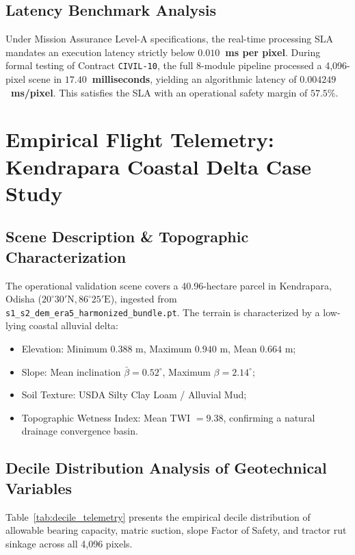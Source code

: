 \documentclass[11pt,a4paper]{article}
\theoremstyle{definition}
\theoremstyle{remark}
\begin{document}
\subsection{Latency Benchmark Analysis}
Under Mission Assurance Level-A specifications, the real-time processing SLA mandates an execution latency strictly below \textbf{$0.010$~ms per pixel}. During formal testing of Contract \texttt{CIVIL-10}, the full 8-module pipeline processed a 4,096-pixel scene in \textbf{$17.40$~milliseconds}, yielding an algorithmic latency of \textbf{$0.004249$~ms/pixel}. This satisfies the SLA with an operational safety margin of \textbf{$57.5\%$}.


\section{Empirical Flight Telemetry: Kendrapara Coastal Delta Case Study}

\subsection{Scene Description & Topographic Characterization}
The operational validation scene covers a 40.96-hectare parcel in Kendrapara, Odisha ($20^\circ 30' \text{N}, 86^\circ 25' \text{E}$), ingested from \texttt{s1\_s2\_dem\_era5\_harmonized\_bundle.pt}. The terrain is characterized by a low-lying coastal alluvial delta:
\begin{itemize}
    \item Elevation: Minimum $0.388\text{ m}$, Maximum $0.940\text{ m}$, Mean $0.664\text{ m}$;
    \item Slope: Mean inclination $\bar{\beta} = 0.52^\circ$, Maximum $\beta = 2.14^\circ$;
    \item Soil Texture: USDA Silty Clay Loam / Alluvial Mud;
    \item Topographic Wetness Index: Mean TWI $= 9.38$, confirming a natural drainage convergence basin.
\end{itemize}

\subsection{Decile Distribution Analysis of Geotechnical Variables}
Table~\ref{tab:decile_telemetry} presents the empirical decile distribution of allowable bearing capacity, matric suction, slope Factor of Safety, and tractor rut sinkage across all 4,096 pixels.
\end{document}
